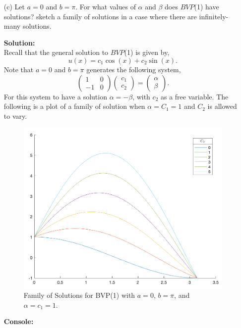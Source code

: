 \documentclass[12pt]{article}
\makeatletter
\theoremstyle{homework}
\newenvironment{exercise}[1]
{\def\@currentlabel{#1}\exercisecore}
{\endexercisecore}
\newcommand{\localhead}[1]{\par\smallskip\noindent\textbf{#1}\nobreak\\}%
\newcommand\solution{\localhead{Solution:}}
\makeatother
\begin{document}
\begin{exercise}{Problem P18}
\begin{enumerate}
      \item[(c)] Let $a = 0$ and $b = \pi$. For what values of $\alpha$ and $\beta$ does $BVP$(1) have solutions?
      sketch a family of solutions in a case where there are infinitely-many solutions. \\
      \solution Recall that the general solution to $BVP$(1) is given by, 
      \begin{equation*}
        u(x) = c_1 \cos(x)  + c_2 \sin(x).
      \end{equation*}
      Note that $a = 0$ and $b = \pi$ generates the following system, 
      \begin{equation*}
        \begin{pmatrix}
          1 & 0\\
          -1 & 0
        \end{pmatrix}
        \begin{pmatrix}
          c_1\\
          c_2
        \end{pmatrix}
         = \begin{pmatrix}
          \alpha\\
          \beta
         \end{pmatrix}.
      \end{equation*}
      For this system to have a solution $\alpha = -\beta$, with $c_2$ as a free variable. The following is a plot of 
      a family of solution when $\alpha= C_1 = 1$  and $C_2$ is allowed to vary.
      \begin{figure}[H]
        \begin{center}
          \caption{Family of Solutions for BVP(1) with $a = 0$, $b = \pi$, and $\alpha = c_1 = 1$.}
          \includegraphics[width=.90\textwidth]{Family.png}
        \end{center}
      \end{figure}


      \textbf{Console:}
      \begin{center}
        
      \end{center}

  \end{enumerate} 
  
\end{exercise}
\end{document}
